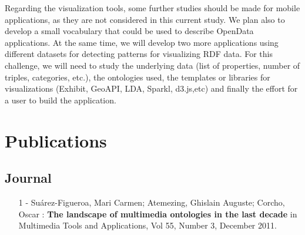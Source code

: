\documentclass[a4paper,11pt]{report}
\begin{document}
Regarding the visualization tools, some further studies should be made for mobile applications, as they are not considered in this current study. We plan also to develop a small vocabulary that could be used to describe OpenData applications. At the same time, we will develop two more applications using different datasets for detecting patterns for visualizing RDF data. For this challenge, we will need to study the underlying data (list of properties, number of triples, categories, etc.), the ontologies used, the templates or libraries for visualizations (Exhibit, GeoAPI, LDA, Sparkl, d3.js,etc) and finally the effort for a user to build the application.


{}
\nocite{*}


{}

\appendix
\chapter{Publications}
\section*{Journal}
\begin{itemize}
\item [1]- Su\'{a}rez-Figueroa, Mari Carmen; Atemezing, Ghislain Auguste; Corcho, Oscar : \textbf{The landscape of 
multimedia ontologies in the last decade} in  Multimedia Tools and Applications, Vol 55, Number 3, December 2011.
\end{itemize}
\end{document}
